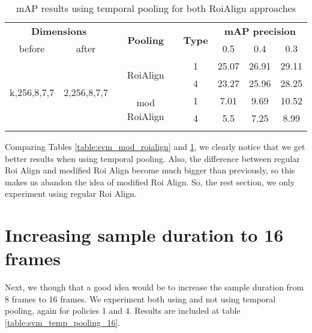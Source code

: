 \begin{center}
\begin{longtable}{||c | c| c| c||c c c||}

  \hline
 \multicolumn{2}{||c|}{\textbf{Dimensions}} & \multirow{2}{*}{\textbf{Pooling}} &\multirow{2}{*}{ \textbf{Type}} &\multicolumn{3}{|c||}{\textbf{mAP precision}}\\

  before & after & {} & {} & 0.5 &  0.4 & 0.3\\
  \hline   \hline

  \multirow{4}{*}{k,256,8,7,7} & \multirow{4}{*}{2,256,8,7,7} & \multirow{2}{*}{RoiAlign}  & 1 & 25.07 & 26.91 & 29.11 \\
  \cline{4-7}
  {} & {} & {} & 4 &  23.27 & 25.96 & 28.25 \\
  \cline{3-7}
  {} & {} & \multirow{2}{*}{mod RoiAlign} & 1 & 7.01 & 9.69 & 10.52 \\
  \cline{4-7}
  {} & {} & {} & 4 & 5.5 & 7.25 & 8.99 \\
  \hline

  \caption{mAP results using temporal pooling for both RoiAlign approaches}
  \label{table:svm_temp_pooling}
\end{longtable} 
\end{center}

Comparing Tables \ref{table:svm_mod_roialign} and \ref{table:svm_temp_pooling}, we clearly notice that we get better results when
using temporal pooling. Also, the difference between regular Roi Align and modified Roi Align become much bigger than previously,
so this makes us abandon the idea of modified Roi Align. So, the rest section, we only experiment using regular Roi Align.

\section{Increasing sample duration to 16 frames}

Next, we though that a good idea would be to increase the sample duration from 8 frames to 16 frames. We experiment both using and not
using temporal pooling, again for policies 1 and 4. Results are included at table \ref{table:svm_temp_pooling_16}. 


